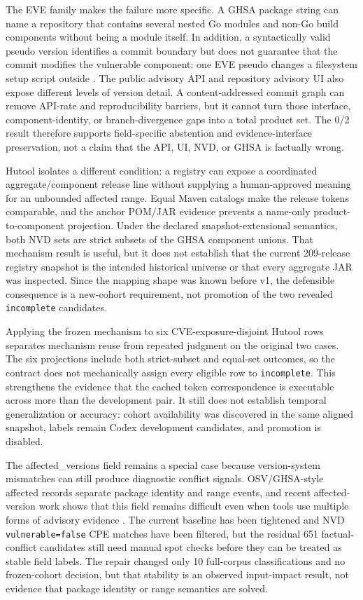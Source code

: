 The EVE family makes the failure more specific. A GHSA package string can name a repository that contains several nested Go modules and non-Go build components without being a module itself. In addition, a syntactically valid pseudo version identifies a commit boundary but does not guarantee that the commit modifies the vulnerable component: one EVE pseudo changes a filesystem setup script outside . The public advisory API and repository advisory UI also expose different levels of version detail. A content-addressed commit graph can remove API-rate and reproducibility barriers, but it cannot turn those interface, component-identity, or branch-divergence gaps into a total product set. The 0/2 result therefore supports field-specific abstention and evidence-interface preservation, not a claim that the API, UI, NVD, or GHSA is factually wrong.

Hutool isolates a different condition: a registry can expose a coordinated aggregate/component release line without supplying a human-approved meaning for an unbounded affected range. Equal Maven catalogs make the release tokens comparable, and the anchor POM/JAR evidence prevents a name-only product-to-component projection. Under the declared snapshot-extensional semantics, both NVD sets are strict subsets of the GHSA component unions. That mechanism result is useful, but it does not establish that the current 209-release registry snapshot is the intended historical universe or that every aggregate JAR was inspected. Since the mapping shape was known before v1, the defensible consequence is a new-cohort requirement, not promotion of the two revealed \texttt{incomplete} candidates.

Applying the frozen mechanism to six CVE-exposure-disjoint Hutool rows separates mechanism reuse from repeated judgment on the original two cases. The six projections include both strict-subset and equal-set outcomes, so the contract does not mechanically assign every eligible row to \texttt{incomplete}. This strengthens the evidence that the cached token correspondence is executable across more than the development pair. It still does not establish temporal generalization or accuracy: cohort availability was discovered in the same aligned snapshot, labels remain Codex development candidates, and promotion is disabled.

The affected\_versions field remains a special case because version-system mismatches can still produce diagnostic conflict signals. OSV/GHSA-style affected records separate package identity and range events, and recent affected-version work shows that this field remains difficult even when tools use multiple forms of advisory evidence \cite{OSVSchema2026,GHSARepo2026,Chen2025AffectedVersions}. The current baseline has been tightened and NVD \texttt{vulnerable=false} CPE matches have been filtered, but the residual 651 factual-conflict candidates still need manual spot checks before they can be treated as stable field labels. The repair changed only 10 full-corpus classifications and no frozen-cohort decision, but that stability is an observed input-impact result, not evidence that package identity or range semantics are solved.

